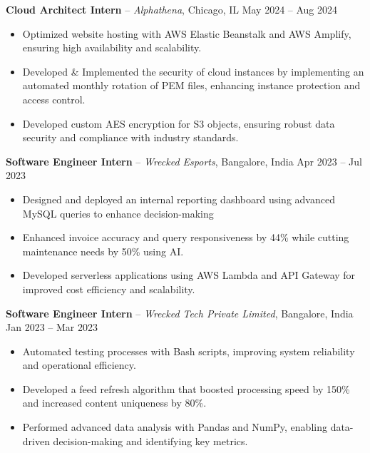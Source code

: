\documentclass[10pt, letterpaper]{article}
\begin{document}
\textbf{\textcolor{myNavy}{Cloud Architect Intern}} -- \textit{Alphathena}, Chicago, IL \hfill \textcolor{myDarkGray}{May 2024 -- Aug 2024}
\begin{itemize}[leftmargin=*, itemsep=0pt, parsep=0pt]
    \item Optimized website hosting with AWS Elastic Beanstalk and AWS Amplify, ensuring high availability and scalability.
    \item Developed \& Implemented the security of cloud instances by implementing an automated monthly rotation of PEM files, enhancing instance protection and access control.
    \item Developed custom AES encryption for S3 objects, ensuring robust data security and compliance with industry standards.
\end{itemize}

\textbf{\textcolor{myNavy}{Software Engineer Intern}} -- \textit{Wrecked Esports}, Bangalore, India \hfill \textcolor{myDarkGray}{Apr 2023 -- Jul 2023}
\begin{itemize}[leftmargin=*, itemsep=0pt, parsep=0pt]
    \item Designed and deployed an internal reporting dashboard using advanced MySQL queries to enhance decision-making
    \item Enhanced invoice accuracy and query responsiveness by 44\% while cutting maintenance needs by 50\% using AI.
    \item Developed serverless applications using AWS Lambda and API Gateway for improved cost efficiency and scalability.
\end{itemize}

\textbf{\textcolor{myNavy}{Software Engineer Intern}} -- \textit{Wrecked Tech Private Limited}, Bangalore, India \hfill \textcolor{myDarkGray}{Jan 2023 -- Mar 2023}
\begin{itemize}[leftmargin=*, itemsep=0pt, parsep=0pt]
    \item Automated testing processes with Bash scripts, improving system reliability and operational efficiency.
    \item Developed a feed refresh algorithm that boosted processing speed by 150\% and increased content uniqueness by 80\%.
    \item Performed advanced data analysis with Pandas and NumPy, enabling data-driven decision-making and identifying key metrics.
\end{itemize}

\vspace{0.1cm}
\end{document}

